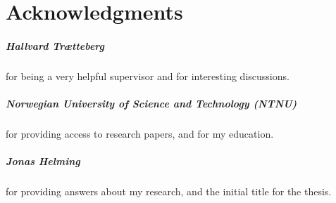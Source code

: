 \chapter*{Acknowledgments}

\paragraph*{Hallvard Trætteberg} for being a very helpful supervisor
and for interesting discussions.

\paragraph*{Norwegian University of Science and Technology (NTNU)} for providing access to research papers, and for my education. 

\paragraph*{Jonas Helming} for providing answers about my research, and the initial title for the thesis.


